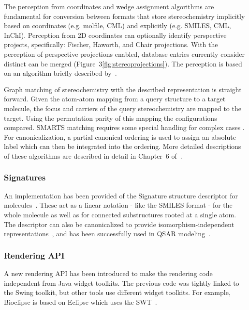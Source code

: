 \documentclass[10pt]{bmcart}
\begin{document}
  The perception from coordinates and wedge assignment algorithms are fundamental for conversion
  between formats that store stereochemistry implicitly based on coordinates (e.g. molfile, CML) and 
  explicitly (e.g. SMILES, CML, InChI). Perception from 2D coordinates can optionally identify
  perspective projects, specifically: Fischer, Haworth, and Chair projections. With the perception of 
  perspective projections enabled, database entries currently consider distinct can be merged
  (Figure~3\ref{fig:stereoprojections}). The perception is based on an algorithm briefly 
  described by~\cite{Karapetyan2015}.


  Graph matching of stereochemistry with the described representation is straight forward. Given
  the atom-atom mapping from a query structure to a target molecule, the focus and carriers of 
  the query stereochemistry are mapped to the target. Using the permutation parity of this mapping
  the configurations compared. SMARTS matching requires some special handling for complex cases 
  \cite{May2014_SMARTS}. For canonicalization, a partial canonical ordering is used to assign an 
  absolute label which can then be integrated into the ordering. More detailed descriptions of 
  these algorithms are described in detail in Chapter~6 of~\cite{May2015}.

  \subsubsection*{Signatures}

  An implementation has been provided of the Signature structure descriptor for
  molecules~\cite{Faulon2003}. These act as a linear notation - like the SMILES format - 
  for the whole molecule as well as for connected substructures rooted at a single atom. The 
  descriptor can also be canonicalized to provide isomorphism-independent
  representations~\cite{Faulon2004}, and has been successfully used in QSAR modeling~\cite{signaturefingerprints,Spjuth2011DS,Moghadam2015,Alvarsson2014,Spjuth2012OS,Norinder2013}.

  \subsubsection*{Rendering API}

  A new rendering API has been introduced to make the rendering code independent
  from Java widget toolkits. The previous code was tightly linked to the Swing
  toolkit, but other tools use different widget toolkits. For example, Bioclipse
  is based on Eclipse which uses the SWT~\cite{spjuth2007bioclipse}. %
  
\end{document}
